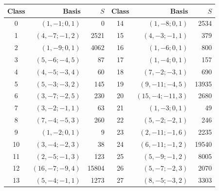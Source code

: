 \begin{center}\small
\begin{tabular}{crr@{\qquad}crr}
\toprule
Class & Basis & \(S\) & Class & Basis & \(S\)\\
\midrule
0 & \((1,-1;0,1)\) & 0 & 14 & \((1,-8;0,1)\) & 2534\\
1 & \((4,-7;-1,2)\) & 2521 & 15 & \((4,-3;-1,1)\) & 379\\
2 & \((1,-9;0,1)\) & 4062 & 16 & \((1,-6;0,1)\) & 800\\
3 & \((5,-6;-4,5)\) & 87 & 17 & \((1,-4;0,1)\) & 157\\
4 & \((4,-5;-3,4)\) & 60 & 18 & \((7,-2;-3,1)\) & 690\\
5 & \((5,-3;-3,2)\) & 145 & 19 & \((9,-11;-4,5)\) & 13935\\
6 & \((3,-7;-2,5)\) & 230 & 20 & \((15,-4;-11,3)\) & 2680\\
7 & \((3,-2;-1,1)\) & 63 & 21 & \((1,-3;0,1)\) & 49\\
8 & \((7,-4;-5,3)\) & 260 & 22 & \((5,-2;-2,1)\) & 246\\
9 & \((1,-2;0,1)\) & 9 & 23 & \((2,-11;-1,6)\) & 2235\\
10 & \((3,-4;-2,3)\) & 38 & 24 & \((6,-11;-1,2)\) & 19540\\
11 & \((2,-5;-1,3)\) & 123 & 25 & \((5,-9;-1,2)\) & 8005\\
12 & \((16,-7;-9,4)\) & 15804 & 26 & \((5,-7;-2,3)\) & 2070\\
13 & \((5,-4;-1,1)\) & 1273 & 27 & \((8,-5;-3,2)\) & 3303\\
\bottomrule
\end{tabular}
\end{center}
